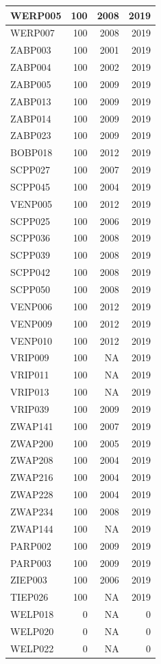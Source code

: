 \documentclass[11pt,]{book}
\begin{document}
\begin{table}
\begin{tabular}[t]{l|r|r|r}
\hline
WERP005 & 100 & 2008 & 2019\\
\hline
WERP007 & 100 & 2008 & 2019\\
\hline
ZABP003 & 100 & 2001 & 2019\\
\hline
ZABP004 & 100 & 2002 & 2019\\
\hline
ZABP005 & 100 & 2009 & 2019\\
\hline
ZABP013 & 100 & 2009 & 2019\\
\hline
ZABP014 & 100 & 2009 & 2019\\
\hline
ZABP023 & 100 & 2009 & 2019\\
\hline
BOBP018 & 100 & 2012 & 2019\\
\hline
SCPP027 & 100 & 2007 & 2019\\
\hline
SCPP045 & 100 & 2004 & 2019\\
\hline
VENP005 & 100 & 2012 & 2019\\
\hline
SCPP025 & 100 & 2006 & 2019\\
\hline
SCPP036 & 100 & 2008 & 2019\\
\hline
SCPP039 & 100 & 2008 & 2019\\
\hline
SCPP042 & 100 & 2008 & 2019\\
\hline
SCPP050 & 100 & 2008 & 2019\\
\hline
VENP006 & 100 & 2012 & 2019\\
\hline
VENP009 & 100 & 2012 & 2019\\
\hline
VENP010 & 100 & 2012 & 2019\\
\hline
VRIP009 & 100 & NA & 2019\\
\hline
VRIP011 & 100 & NA & 2019\\
\hline
VRIP013 & 100 & NA & 2019\\
\hline
VRIP039 & 100 & 2009 & 2019\\
\hline
ZWAP141 & 100 & 2007 & 2019\\
\hline
ZWAP200 & 100 & 2005 & 2019\\
\hline
ZWAP208 & 100 & 2004 & 2019\\
\hline
ZWAP216 & 100 & 2004 & 2019\\
\hline
ZWAP228 & 100 & 2004 & 2019\\
\hline
ZWAP234 & 100 & 2008 & 2019\\
\hline
ZWAP144 & 100 & NA & 2019\\
\hline
PARP002 & 100 & 2009 & 2019\\
\hline
PARP003 & 100 & 2009 & 2019\\
\hline
ZIEP003 & 100 & 2006 & 2019\\
\hline
TIEP026 & 100 & NA & 2019\\
\hline
WELP018 & 0 & NA & 0\\
\hline
WELP020 & 0 & NA & 0\\
\hline
WELP022 & 0 & NA & 0\\
\hline
\end{tabular}
\end{table}
\end{document}
